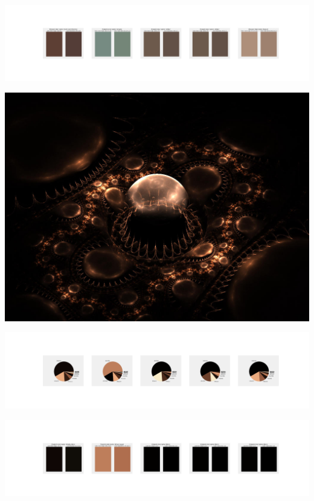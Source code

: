 \documentclass[11pt]{article}
\begin{document}
\begin{landscape}
    \begin{center}
    \includegraphics[width=250mm]{./nbimg/peak-406.jpg}
    \end{center}
    

    \begin{center}
    \includegraphics[width=\textwidth]{./nbimg/file (6).jpg}
    \end{center}

    \begin{center}
    \includegraphics[width=250mm]{./nbimg/pie-407.jpg}
    \end{center}

    \begin{center}
    \includegraphics[width=250mm]{./nbimg/peak-407.jpg}
    \end{center}
    


\end{landscape}
\end{document}

